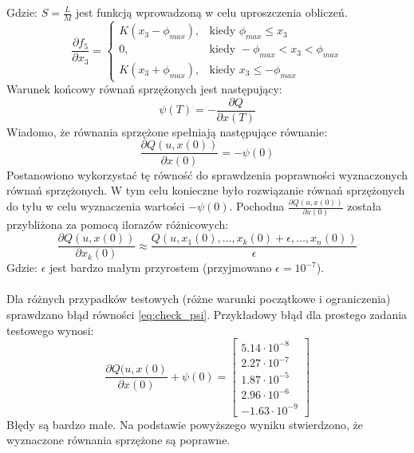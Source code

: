 \noindent Gdzie:\newline
\(S=\frac{L}{M}\) jest funkcją wprowadzoną w celu uproszczenia obliczeń.
\begin{equation}
\frac{\partial f_5}{\partial x_3}=
	\begin{cases}
	K(x_3-\phi_{max}), & \text{kiedy } \phi_{max}\leqslant x_3\\
	0, & \text{kiedy } -\phi_{max}<x_3<\phi_{max}\\
	K(x_3+\phi_{max}), & \text{kiedy } x_3\leqslant -\phi_{max}
	\end{cases}
\end{equation}
Warunek końcowy równań sprzężonych jest następujący:
\begin{equation}
\psi(T)=-\frac{\partial Q}{\partial x(T)}
\end{equation}
Wiadomo, że równania sprzężone spełniają następujące równanie:
\begin{equation}
\frac{\partial Q(u,x(0))}{\partial x(0)}=-\psi(0)
\label{eq:check_psi}
\end{equation}
Postanowiono wykorzystać tę równość do sprawdzenia poprawności wyznaczonych równań sprzężonych. W tym celu konieczne było rozwiązanie równań sprzężonych do tyłu w celu wyznaczenia wartości \(-\psi(0)\). Pochodna \(\frac{\partial Q(u,x(0))}{\partial x(0)}\) została przybliżona za pomocą ilorazów różnicowych:
\begin{equation}
\frac{\partial Q(u,x(0))}{\partial x_k(0)}\approx\frac{Q(u,x_1(0),\dots, x_k(0)+\epsilon,\dots,x_n(0))}{\epsilon}
\end{equation}
\noindent Gdzie:\newline
\(\epsilon\) jest bardzo małym przyrostem (przyjmowano \(\epsilon=10^{-7}\)).
\paragraph*{}
Dla różnych przypadków testowych (różne warunki początkowe i ograniczenia) sprawdzano błąd równości \eqref{eq:check_psi}. Przykładowy błąd dla prostego zadania testowego wynosi:
\begin{equation}
\frac{\partial Q(u,x(0)}{\partial x(0)}+\psi(0)=
\begin{bmatrix}
5.14\cdot 10^{-8}\\
2.27\cdot 10^{-7}\\
1.87\cdot 10^{-5}\\
2.96\cdot 10^{-6}\\
-1.63\cdot 10^{-9}
\end{bmatrix}
\end{equation}
Błędy są bardzo małe. Na podstawie powyższego wyniku stwierdzono, że wyznaczone równania sprzężone są poprawne.